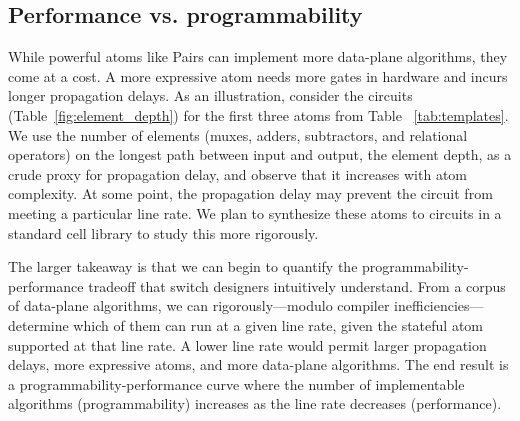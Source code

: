 
\subsection{Performance vs. programmability}
\label{ss:perfprog}

While powerful atoms like Pairs can implement more data-plane algorithms, they
come at a cost.  A more expressive atom needs more gates in hardware and incurs
longer propagation delays.  As an illustration, consider the circuits
(Table~\ref{fig:element_depth}) for the first three atoms from Table
~\ref{tab:templates}. We use the number of elements (muxes, adders,
subtractors, and relational operators) on the longest path between input and
output, the element depth, as a crude proxy for propagation delay, and observe
that it increases with atom complexity. At some point, the propagation delay
may prevent the circuit from meeting a particular line rate.  We plan to
synthesize these atoms to circuits in a standard cell library to study this
more rigorously.

The larger takeaway is that we can begin to quantify the
programmability-performance tradeoff that switch designers intuitively
understand. From a corpus of data-plane algorithms, we can rigorously---modulo
compiler inefficiencies---determine which of them can run at a given line rate,
given the stateful atom supported at that line rate. A lower line rate would
permit larger propagation delays, more expressive atoms, and more data-plane
algorithms. The end result is a programmability-performance curve where the
number of implementable algorithms (programmability) increases as the line rate
decreases (performance).
